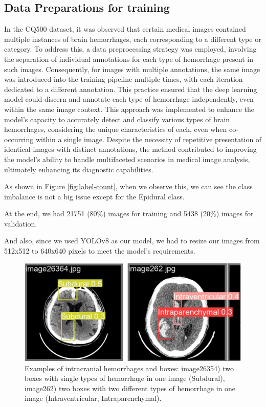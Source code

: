 \documentclass[Print]{../Style/isecure-v24}
\begin{document}
\subsection{Data Preparations for training} \label{sec: Data prep}
In the CQ500 dataset, it was observed that certain medical images contained multiple instances of brain hemorrhages, each corresponding to a different type or category. To address this, a data preprocessing strategy was employed, involving the separation of individual annotations for each type of hemorrhage present in such images.
Consequently, for images with multiple annotations, the same image was introduced into the training pipeline multiple times, with each iteration dedicated to a different annotation. This practice ensured that the deep learning model could discern and annotate each type of hemorrhage independently, even within the same image context.
This approach was implemented to enhance the model's capacity to accurately detect and classify various types of brain hemorrhages, considering the unique characteristics of each, even when co-occurring within a single image. Despite the necessity of repetitive presentation of identical images with distinct annotations, the method contributed to improving the model's ability to handle multifaceted scenarios in medical image analysis, ultimately enhancing its diagnostic capabilities.

As shown in Figure \ref{fig:label-count}, when we observe this, we can see the class imbalance is not a big issue except for the Epidural class.  

At the end, we had 21751 (80\%) images for training and 5438 (20\%) images for validation.

And also, since we used YOLOv8 as our model, we had to resize our images from 512x512 to 640x640 pixels to meet the model's requirements.

\newpage
\onecolumn
{\begin{figure}[h]
    \centering
    \includegraphics[width=1.0\linewidth]{ISeCure Draft/Images/edited.png}
    \captionsetup{font=small}
    \caption{Examples of intracranial hemorrhages and boxes: image26354) two boxes with single types of hemorrhage in one image (Subdural),
image262) two boxes with two different types of hemorrhage in one image (Intraventricular, Intraparenchymal).}
    \label{fig:labels}
\end{figure}}
\end{document}
